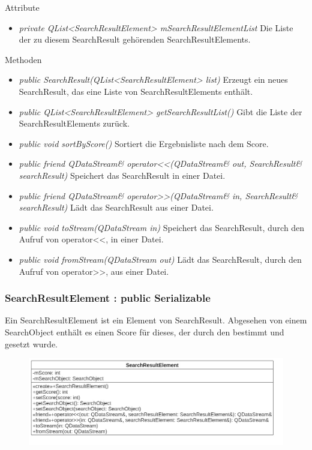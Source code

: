 Attribute
\begin{itemize}
\item\textit{private QList<SearchResultElement> mSearchResultElementList} Die Liste der zu diesem SearchResult gehörenden SearchResultElements.
\end{itemize}

Methoden
\begin{itemize}
\item \textit{public SearchResult(QList<SearchResultElement> list)} Erzeugt ein neues SearchResult, das eine Liste von SearchResultElements enthält.
\item \textit{public QList<SearchResultElement> getSearchResultList()} Gibt die Liste der SearchResultElements zurück.
\item \textit{public void sortByScore()} Sortiert die Ergebnisliste nach dem Score.
\item \textit{public friend QDataStream\& operator<<(QDataStream\& out, SearchResult\& searchResult)} Speichert das SearchResult in einer Datei.
\item \textit{public friend QDataStream\& operator>>(QDataStream\& in, SearchResult\& searchResult)} Lädt das SearchResult aus einer Datei.
\item \textit{public void toStream(QDataStream in)} Speichert das SearchResult, durch den Aufruf von operator<<, in einer Datei.
\item \textit{public void fromStream(QDataStream out)} Lädt das SearchResult, durch den Aufruf von operator>>, aus einer Datei.
\end{itemize}

\subsubsection*{SearchResultElement : public Serializable}
Ein SearchResultElement ist ein Element von SearchResult. Abgesehen von einem SearchObject enthält es einen Score für dieses, der durch den  bestimmt und gesetzt wurde.

\begin{figure}[H]
\centering
\includegraphics[width=\linewidth]{img/Klassendiagramm/Klassen/Model/SearchResultElement}
\label{fig:searchResultElement}
\end{figure}

